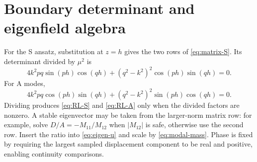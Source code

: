 \chapter{Boundary determinant and eigenfield algebra}\label{app:boundary}
For the S ansatz, substitution at $z=h$ gives the two rows of
\cref{eq:matrix-S}. Its determinant divided by $\mu^2$ is
\begin{equation}
4k^2pq\sin(ph)\cos(qh)+(q^2-k^2)^2\cos(ph)\sin(qh)=0.
\end{equation}
For A modes,
\begin{equation}
4k^2pq\cos(ph)\sin(qh)+(q^2-k^2)^2\sin(ph)\cos(qh)=0.
\end{equation}
Dividing produces \cref{eq:RL-S} and \cref{eq:RL-A} only when the divided factors are
nonzero. A stable eigenvector may be taken from the larger-norm matrix row: for
example, solve $D/A=-M_{11}/M_{12}$ when $|M_{12}|$ is safe, otherwise use the
second row. Insert the ratio into \cref{eq:eigen-u} and scale by
\cref{eq:modal-mass}. Phase is fixed by requiring the largest sampled displacement
component to be real and positive, enabling continuity comparisons.
